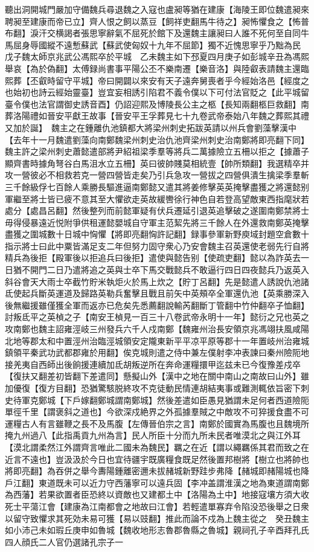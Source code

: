聽出洞開城門嚴加守備魏兵尋退魏之入寇也盧昶等猶在建康【海陵王即位魏遣昶來聘昶至建康而帝已立】齊人恨之飼以蒸豆【飼祥吏翻馬牛待之】昶怖懼食之【怖普布翻】淚汗交横謁者張思寧辭氣不屈死於館下及還魏主讓昶曰人誰不死何至自同牛馬屈身辱國縱不遠慙蘇武【蘇武使匈奴十九年不屈節】獨不近愧思寧乎乃黜為民　戊子魏太師京兆武公馮熙卒於平城　乙未魏主如下邳夏四月庚子如彭城辛丑為馮熙舉哀【為於偽翻】太傅録尚書事平陽公丕不樂南遷【樂音洛】與陸叡表請魏主還臨熙葬【丕叡時留守平城】帝曰開闢以來安有天子遠奔舅喪者乎今經始洛邑【經度之也始初也詩云經始靈臺】豈宜妄相誘引陷君不義令僕以下可付法官貶之【此平城留臺令僕也法官謂御史誘音酉】仍詔迎熙及博陵長公主之柩【長知兩翻柩巨救翻】南葬洛陽禮如晉安平獻王故事【晉安平王孚葬見七十九卷武帝泰始八年魏之葬熙其禮又加於誕】　魏主之在鍾離仇池鎮都大將梁州刺史拓跋英請以州兵會劉藻擊漢中【去年十一月魏遣劉藻向南鄭魏梁州刺史治仇池齊梁州刺史治南鄭將即亮翻下同】魏主許之梁州刺史蕭懿遣部將尹紹祖梁季羣等將兵二萬據險立五柵以拒之【據蕭子顯齊書時據角弩谷白馬沮水立五柵】英曰彼帥賤莫相統壹【帥所類翻】我選精卒并攻一營彼必不相救若克一營四營皆走矣乃引兵急攻一營拔之四營俱潰生擒梁季羣斬三千餘級俘七百餘人乘勝長驅進逼南鄭懿又遣其將姜修擊英英掩擊盡獲之將還懿别軍繼至將士皆已疲不意其至大懼欲走英故緩轡徐行神色自若登高望敵東西指麾狀若處分【處昌呂翻】然後整列而前懿軍疑有伏兵遷延引退英追擊破之遂圍南鄭禁將士毋得侵暴遠近悦附爭供租運懿嬰城自守軍主范絜先將三千餘人在外還救南鄭英掩擊盡獲之圍城數十日城中恟懼【將即亮翻恟許記翻】録事參軍新野庾域封題空倉數十指示將士曰此中粟皆滿足支二年但努力固守衆心乃安會魏主召英還使老弱先行自將精兵為後拒【殿軍後以拒追兵曰後拒】遣使與懿告别【使疏吏翻】懿以為詐英去一日猶不開門二日乃遣將追之英與士卒下馬交戰懿兵不敢逼行四日四夜懿兵乃返英入斜谷會天大雨士卒截竹貯米執炬火於馬上炊之【貯丁呂翻】先是懿遣人誘說仇池諸氐使起兵斷英運道及歸路英勒兵奮擊且戰且前矢中英頰卒全軍還仇池【英乘勝深入後無繼援雖僅獲全軍而返亦已危矣先悉薦翻說輸芮翻斷丁管翻中竹仲翻卒子恤翻】討叛氐平之英楨之子【南安王楨見一百三十八卷武帝永明十一年】懿衍之兄也英之攻南鄭也魏主詔雍涇岐三州發兵六千人戍南鄭【魏雍州治長安領京兆馮翊扶風咸陽北地等郡太和中置涇州治臨涇城領安定隴東新平平凉平原等郡十一年置岐州治雍城鎮領平秦武功武都郡雍於用翻】俟克城則遣之侍中兼左僕射李冲表諫曰秦州險阨地接羌夷自西師出後餉援連續加氐胡叛逆所在奔命運糧擐甲迄兹未已今復豫差戍卒【復扶又翻差初皆翻下差遣同】懸擬山外【漢中之地在關中南山之南故曰山外】雖加優復【復方目翻】恐猶驚駭脱終攻不克徒動民情連胡結夷事或難測輒依旨密下刺史待軍克鄭城【下戶嫁翻鄭城謂南鄭城】然後差遣如臣愚見猶謂未足何者西道險阨單徑千里【謂褒斜之道也】今欲深戍絶界之外孤據羣賊之中敵攻不可猝援食盡不可運糧古人有言雖鞭之長不及馬腹【左傳晉伯宗之言】南鄭於國實為馬腹也且魏境所掩九州過八【此指禹貢九州為言】民人所臣十分而九所未民者唯漠北之與江外耳【漠北謂柔然江外謂齊言唯此二國未為魏民】羈之在近【謂以繩羈係其君而致之在近言不遠也】豈汲汲於今日也宜待疆宇既廣糧食既足然後置邦樹將【樹立也將帥也將即亮翻】為吞併之舉今夀陽鍾離密邇未拔赭城新野跬步弗降【赭城即赭陽城也降戶江翻】東道既未可以近力守西藩寧可以遠兵固【李冲盖謂淮漢之地為東道謂南鄭為西藩】若果欲置者臣恐終以資敵也又建都土中【洛陽為土中】地接寇壤方須大收死士平蕩江會【建康為江南都會之地故曰江會】若輕遣單寡弃令陷没恐後舉之日衆以留守致懼求其死効未易可獲【易以豉翻】推此而論不戍為上魏主從之　癸丑魏主如小沛己未如瑕丘庚申如魯城【魏收地形志魯郡魯縣之魯城】親祠孔子辛酉拜孔氏四人顔氏二人官仍選諸孔宗子一